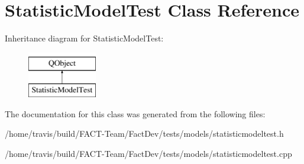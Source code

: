 \hypertarget{classStatisticModelTest}{\section{Statistic\-Model\-Test Class Reference}
\label{classStatisticModelTest}
}
Inheritance diagram for Statistic\-Model\-Test\-:\begin{figure}[H]
\begin{center}
\leavevmode
\includegraphics[height=2.000000cm]{db/df5/classStatisticModelTest}
\end{center}
\end{figure}


The documentation for this class was generated from the following files\-:\begin{DoxyCompactItemize}
\item 
/home/travis/build/\-F\-A\-C\-T-\/\-Team/\-Fact\-Dev/tests/models/statisticmodeltest.\-h\item 
/home/travis/build/\-F\-A\-C\-T-\/\-Team/\-Fact\-Dev/tests/models/statisticmodeltest.\-cpp\end{DoxyCompactItemize}
